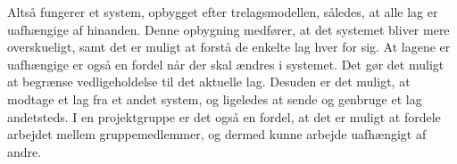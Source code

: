 Altså fungerer et system, opbygget efter trelagsmodellen, således, at alle lag er uafhængige af hinanden. Denne opbygning medfører, at det systemet bliver mere overskueligt, samt det er muligt at forstå de enkelte lag hver for sig. At lagene er uafhængige er også en fordel når der skal ændres i systemet. Det gør det muligt at begrænse vedligeholdelse til det aktuelle lag. Desuden er det muligt, at modtage et lag fra et andet system, og ligeledes at sende og genbruge et lag andetsteds. I en projektgruppe er det også en fordel, at det er muligt at fordele arbejdet mellem gruppemedlemmer, og dermed kunne arbejde uafhængigt af andre.
  